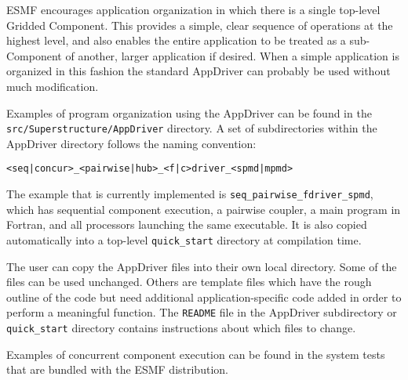 %


ESMF encourages application organization in which there is a single 
top-level Gridded Component.  This provides a simple, clear sequence
of operations at the highest level, and also enables the entire 
application to be treated as a sub-Component of another, larger 
application if desired.  When a simple application is organized in this fashion 
the standard AppDriver can probably be used without much modification.  

\begin{sloppypar}
Examples of program organization using the AppDriver can be found in the 
{\tt src/Superstructure/AppDriver} directory.  A set of subdirectories 
within the AppDriver directory follows the naming convention:
\end{sloppypar}
\begin{verbatim}
<seq|concur>_<pairwise|hub>_<f|c>driver_<spmd|mpmd>
\end{verbatim}

The example that is currently implemented is
{\tt seq\_pairwise\_fdriver\_spmd}, which
has sequential component execution, a pairwise coupler, a main program
in Fortran, and all processors launching the same executable.
It is also copied automatically into a top-level 
{\tt quick\_start} directory at compilation time.  

The user can copy the AppDriver files into
their own local directory. Some of the files can be used unchanged.
Others are template files which have the rough outline of the code but
need additional application-specific code added in order to perform a
meaningful function.  The {\tt README} file in the AppDriver 
subdirectory or {\tt quick\_start} directory contains instructions about 
which files to change.

Examples of concurrent component execution can be found in the
system tests that are bundled with the ESMF distribution.



